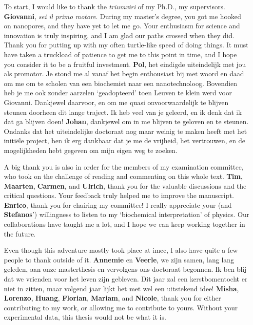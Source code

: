 To start, I would like to thank the \textit{triumviri} of my Ph.D., my supervisors. \textbf{Giovanni},
\textit{sei il primo motore}. During my master's degree, you got me hooked on nanopores, and they have yet to
let me go. Your enthusiasm for science and innovation is truly inspiring, and I am glad our paths crossed when
they did. Thank you for putting up with my often turtle-like speed of doing things. It must have taken a
truckload of patience to get me to this point in time, and I hope you consider it to be a fruitful investment.
\textbf{Pol}, het eindigde uiteindelijk met jou als promotor. Je stond me al vanaf het begin enthousiast bij
met woord en daad om me om te scholen van een biochemist naar een nanotechnoloog. Bovendien heb je me ook
zonder aarzelen `geadopteerd' toen Leuven te klein werd voor Giovanni. Dankjewel daarvoor, en om me quasi
onvoorwaardelijk te blijven steunen doorheen dit lange traject. Ik heb veel van je geleerd, en ik denk dat ik
dat ga blijven doen! \textbf{Johan}, dankjewel om in me blijven te geloven en te steunen. Ondanks dat het
uiteindelijke doctoraat nog maar weinig te maken heeft met het initi\"{e}le project, ben ik erg dankbaar dat
je me de vrijheid, het vertrouwen, en de mogelijkheden hebt gegeven om mijn eigen weg te zoeken.

A big thank you is also in order for the members of my examination committee, who took on the challenge of
reading and commenting on this whole text. \textbf{Tim}, \textbf{Maarten}, \textbf{Carmen}, and
\textbf{Ulrich}, thank you for the valuable discussions and the critical questions. Your feedback truly helped
me to improve the manuscript. \textbf{Enrico}, thank you for chairing my committee! I really appreciate your
(and \textbf{Stefanos}') willingness to listen to my `biochemical interpretation' of physics. Our
collaborations have taught me a lot, and I hope we can keep working together in the future.

Even though this adventure mostly took place at imec, I also have quite a few people to thank outside of it.
\textbf{Annemie} en \textbf{Veerle}, we zijn samen, lang lang geleden, aan onze masterthesis en vervolgens ons
doctoraat begonnen. Ik ben blij dat we vrienden voor het leven zijn gebleven. Dit jaar zal een kerstbomentocht
er niet in zitten, maar volgend jaar lijkt het met wel een uitstekend idee! \textbf{Misha}, \textbf{Lorenzo},
\textbf{Huang}, \textbf{Florian}, \textbf{Mariam}, and \textbf{Nicole}, thank you for either contributing to
my work, or allowing me to contribute to yours. Without your experimental data, this thesis would not be what
it is.

